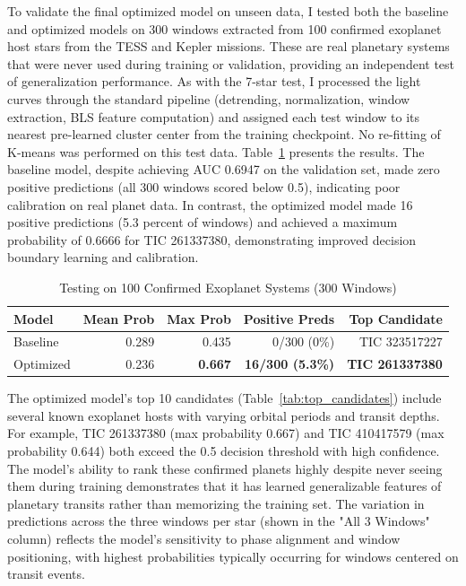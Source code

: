\documentclass[letterpaper]{article} %
\begin{document}
To validate the final optimized model on unseen data, I tested both the baseline and optimized models on 300 windows extracted from 100 confirmed exoplanet host stars from the TESS and Kepler missions. These are real planetary systems that were never used during training or validation, providing an independent test of generalization performance. As with the 7-star test, I processed the light curves through the standard pipeline (detrending, normalization, window extraction, BLS feature computation) and assigned each test window to its nearest pre-learned cluster center from the training checkpoint. No re-fitting of K-means was performed on this test data. Table~\ref{tab:planet_test_results} presents the results. The baseline model, despite achieving AUC 0.6947 on the validation set, made zero positive predictions (all 300 windows scored below 0.5), indicating poor calibration on real planet data. In contrast, the optimized model made 16 positive predictions (5.3 percent of windows) and achieved a maximum probability of 0.6666 for TIC 261337380, demonstrating improved decision boundary learning and calibration.

\begin{table}[h]
\centering
\caption{Testing on 100 Confirmed Exoplanet Systems (300 Windows)}
\label{tab:planet_test_results}
\begin{tabular}{@{}lrrrr@{}}
\toprule
\textbf{Model} & \textbf{Mean Prob} & \textbf{Max Prob} & \textbf{Positive Preds} & \textbf{Top Candidate} \\
\midrule
Baseline & 0.289 & 0.435 & 0/300 (0\%) & TIC 323517227 \\
Optimized & 0.236 & \textbf{0.667} & \textbf{16/300 (5.3\%)} & \textbf{TIC 261337380} \\
\bottomrule
\end{tabular}
\end{table}

The optimized model's top 10 candidates (Table~\ref{tab:top_candidates}) include several known exoplanet hosts with varying orbital periods and transit depths. For example, TIC 261337380 (max probability 0.667) and TIC 410417579 (max probability 0.644) both exceed the 0.5 decision threshold with high confidence. The model's ability to rank these confirmed planets highly despite never seeing them during training demonstrates that it has learned generalizable features of planetary transits rather than memorizing the training set. The variation in predictions across the three windows per star (shown in the "All 3 Windows" column) reflects the model's sensitivity to phase alignment and window positioning, with highest probabilities typically occurring for windows centered on transit events.
\end{document}
